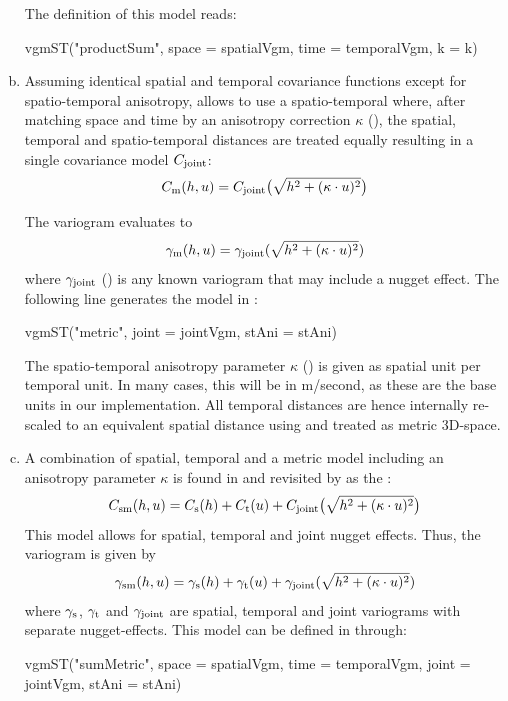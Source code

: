 \begin{enumerate}[a)]
The  definition of this model reads:

\begin{example*}
vgmST("productSum", space = spatialVgm, time = temporalVgm, k = k)
\end{example*}

\item 
Assuming identical spatial and temporal covariance functions except for spatio-temporal anisotropy, allows to use a spatio-temporal  where, after matching space and time by an anisotropy correction $\kappa$ (), the spatial, temporal and spatio-temporal distances are treated equally resulting in a single covariance model $C_{\rm joint}$: 
$$C_{\rm m}(h,u)=C_{\rm joint}\big(\sqrt{h^2+(\kappa\cdot u)^2}\big)$$

The variogram evaluates to
$$ \gamma_{\rm m} (h,u) = \gamma_{\rm joint}(\sqrt{h^2+(\kappa\cdot u)^2}) $$
where $\gamma_{\rm joint}$ () is any known variogram that may include a nugget effect. The following line generates the model in :

\begin{example*}
vgmST("metric", joint = jointVgm, stAni = stAni)
\end{example*}

The spatio-temporal anisotropy parameter $\kappa$ () is given as spatial unit per temporal unit. In many cases, this will be in m/second, as these are the base units in our implementation. All temporal distances are hence internally re-scaled to an equivalent spatial distance using  and treated as metric 3D-space.

\item
A combination of spatial, temporal and a metric model including an anisotropy parameter $\kappa$ is found in \citet{Bilonick1988} and revisited by \citet{Snepvangers2003} as the : 
$$C_{\rm sm}(h,u)=C_{\rm s}(h)+C_{\rm t}(u)+C_{\rm joint}\big(\sqrt{h^2+(\kappa\cdot u)^2}\big)$$ 
This model allows for spatial, temporal and joint nugget effects. Thus, the variogram is given by
$$ \gamma_{\rm sm}(h,u)= \gamma_{\rm  s}(h) + \gamma_{\rm t}(u) + \gamma_{\rm joint}(\sqrt{h^2+(\kappa\cdot u)^2})$$
where $\gamma_{\rm s}$, $\gamma_{\rm t}$ and $\gamma_{\rm joint}$ are spatial, temporal and joint variograms with separate nugget-effects. This model can be defined in  through:

\begin{example*}
vgmST("sumMetric", space = spatialVgm, time = temporalVgm, joint = jointVgm,
      stAni = stAni)
\end{example*}


\end{enumerate}
